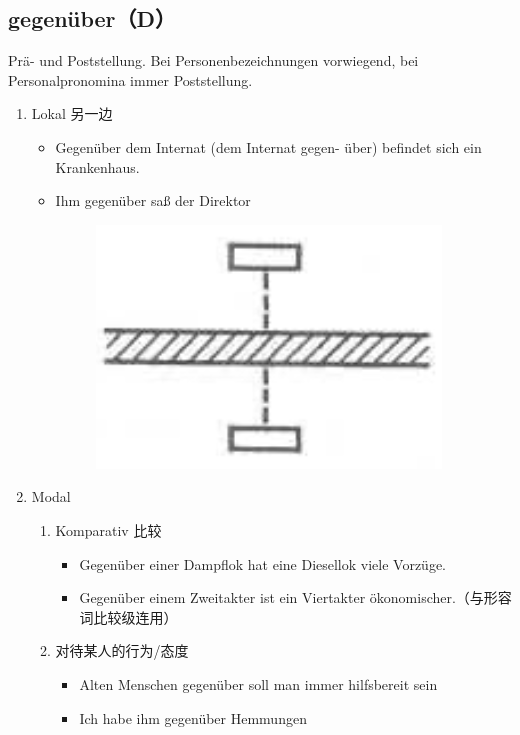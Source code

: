 \documentclass[UTF8]{report}
\begin{document}
\subsection{gegenüber（D）}
Prä- und Poststellung. Bei Personenbezeichnungen vorwiegend, bei Personalpronomina immer Poststellung.
\begin{enumerate}
    \item Lokal 另一边
    \begin{itemize}
        \item Gegenüber dem Internat (dem Internat gegen- über) befindet sich ein Krankenhaus.
        \item Ihm gegenüber saß der Direktor
        \begin{figure}[H]
            \centering
            \includegraphics[scale=0.3]{gegenu.png}
        \end{figure}
    \end{itemize}
    \item Modal
    \begin{enumerate}
        \item Komparativ 比较
        \begin{itemize}
            \item Gegenüber einer Dampflok hat eine Diesellok viele Vorzüge.
            \item Gegenüber einem Zweitakter ist ein Viertakter ökonomischer.（与形容词比较级连用）
        \end{itemize}
        \item 对待某人的行为/态度
        \begin{itemize}
            \item Alten Menschen gegenüber soll man immer hilfsbereit sein
            \item Ich habe ihm gegenüber Hemmungen
        \end{itemize}
    \end{enumerate}
\end{enumerate}
\end{document}
